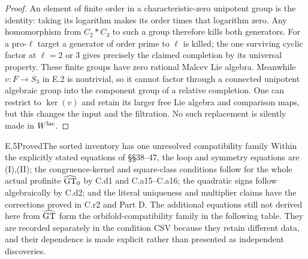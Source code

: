 \begin{proof}
An element of finite order in a characteristic-zero unipotent group
is the identity: taking its logarithm makes its order times that
logarithm zero. Any homomorphism from $C_2*C_3$ to such a group
therefore kills both generators. For a pro-$\ell$ target a generator
of order prime to $\ell$ is killed; the one surviving cyclic factor
at $\ell=2$ or $3$ gives precisely the claimed completion by its
universal property. These finite groups have zero rational
Malcev Lie algebra. Meanwhile $v:F\to S_3$ in E.2 is nontrivial,
so it cannot factor through a connected unipotent algebraic group
into the component group of a relative completion. One can restrict
to $\ker(v)$ and retain its larger free Lie algebra and comparison
maps, but this changes the input and the filtration. No such replacement
is silently made in $W^{\rm lac}$.
\end{proof}

\begin{claim}{E.5}{Proved}{The sorted inventory has one unresolved compatibility family}
Within the explicitly stated equations of \S\S38--47, the loop and
symmetry equations are (I),(II); the congruence-kernel and square-class
conditions follow for the whole actual profinite $\widehat{\mathrm{GT}}_0$ by
C.d1 and C.a15--C.a16; the quadratic signs follow algebraically by
C.d2; and the literal uniqueness and multiplier claims have the
corrections proved in C.r2 and Part D. The additional equations still
not derived here from $\widehat{\mathrm{GT}}$ form the orbifold-compatibility family
in the following table. They are recorded separately in the condition
CSV because they retain different data, and their dependence is made
explicit rather than presented as independent discoveries.
\end{claim}

